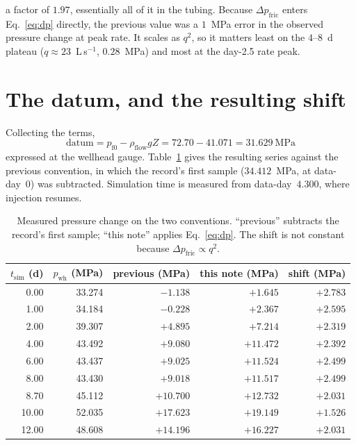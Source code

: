 \documentclass[11pt]{article}
\newcommand{\pfz}{p_{\mathrm{f}0}}
\newcommand{\pwh}{p_{\mathrm{wh}}}
\begin{document}
\noindent
a factor of $1.97$, essentially all of it in the tubing. Because
$\Delta p_{\mathrm{fric}}$ enters Eq.~\eqref{eq:dp} directly, the previous
value was a $1$~MPa error in the observed pressure change at peak rate. It
scales as $q^{2}$, so it matters least on the $4$--$8$~d plateau
($q \approx 23$~L\,s$^{-1}$, $0.28$~MPa) and most at the day-2.5 rate peak.

\section{The datum, and the resulting shift}

Collecting the terms,
\begin{equation}
  \text{datum} = \pfz - \rho_{\mathrm{flow}} g Z
               = 72.70 - 41.071
               = \boxed{31.629~\mathrm{MPa}}
\end{equation}
expressed at the wellhead gauge. Table~\ref{tab:series} gives the resulting
series against the previous convention, in which the record's first sample
($34.412$~MPa, at data-day~0) was subtracted. Simulation time is measured from
data-day~$4.300$, where injection resumes.

\begin{table}[htbp]
\centering
\caption{Measured pressure change on the two conventions. ``previous''
subtracts the record's first sample; ``this note'' applies
Eq.~\eqref{eq:dp}. The shift is not constant because
$\Delta p_{\mathrm{fric}} \propto q^{2}$.}
\label{tab:series}
\begin{tabular}{rrrrr}
  \toprule
  $t_{\mathrm{sim}}$ (d) & $\pwh$ (MPa) & previous (MPa) & this note (MPa) & shift (MPa) \\
  \midrule
   0.00 & 33.274 & $-1.138$ & $+1.645$ & $+2.783$ \\
   1.00 & 34.184 & $-0.228$ & $+2.367$ & $+2.595$ \\
   2.00 & 39.307 & $+4.895$ & $+7.214$ & $+2.319$ \\
   4.00 & 43.492 & $+9.080$ & $+11.472$ & $+2.392$ \\
   6.00 & 43.437 & $+9.025$ & $+11.524$ & $+2.499$ \\
   8.00 & 43.430 & $+9.018$ & $+11.517$ & $+2.499$ \\
   8.70 & 45.112 & $+10.700$ & $+12.732$ & $+2.031$ \\
  10.00 & 52.035 & $+17.623$ & $+19.149$ & $+1.526$ \\
  12.00 & 48.608 & $+14.196$ & $+16.227$ & $+2.031$ \\
  \bottomrule
\end{tabular}
\end{table}
\end{document}
